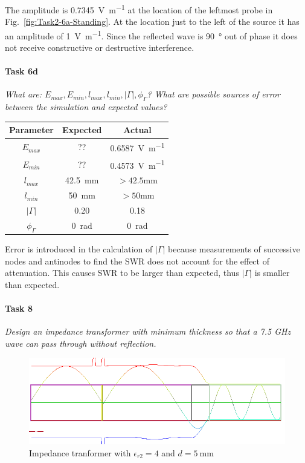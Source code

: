 The amplitude is \SI{0.7345}{\volt\per\meter} at the location of the leftmost probe in Fig.~\ref{fig:Task2-6a-Standing}.
At the location just to the left of the source it has an amplitude of \SI{1}{\volt\per\meter}.
Since the reflected wave is \SI{90}{\degree} out of phase it does not receive constructive or destructive interference.

\paragraph{Task 6d} \textit{What are: $E_{max}, E_{min}, l_{max}, l_{min}, \left|\Gamma\right|, \phi_\Gamma$? What are possible sources of error between the simulation and expected values?}
\begin{table}[htpb]
	\centering
	\begin{tabular}{@{}ccc@{}}
		\toprule
		Parameter             & Expected                   & Actual \\ 
		\midrule
		$E_{max}$             & ?? & \SI{0.6587}{\volt\per\meter} \\
		$E_{min}$             & ?? & \SI{0.4573}{\volt\per\meter} \\
		$l_{max}$             & \SI{42.5}{\milli\meter}    & $>42.5$\si{\milli\meter} \\
		$l_{min}$             & \SI{50}{\milli\meter}      & $>50$\si{\milli\meter} \\
		$\left|\Gamma\right|$ & 0.20 & 0.18 \\
		$\phi_\Gamma$         & 0~\si{\radian} & 0~\si{\radian} \\
		\bottomrule
	\end{tabular}
\end{table}

Error is introduced in the calculation of $\left|\Gamma\right|$ because measurements of successive nodes and antinodes to find the SWR does not account for the effect of attenuation. This causes SWR to be larger than expected, thus $\left|\Gamma\right|$ is smaller than expected.

\pagebreak
\paragraph{Task 8} \textit{Design an impedance transformer with minimum thickness so that a 7.5 GHz wave can pass through without reflection.}

\begin{figure}[tbph]
\centering
\includegraphics[width=0.95\linewidth]{graphics/Task3-8-Standing_5mm}
\caption{Impedance tranformer with $\epsilon_{r2} = 4$ and $d = \SI{5}{\milli\meter}$}
\label{fig:Task3-8-Standing_5mm}
\end{figure}

